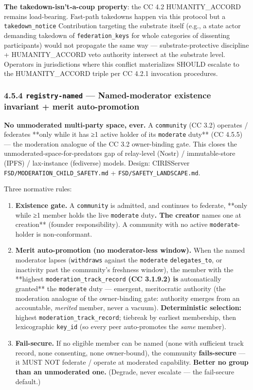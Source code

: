 \documentclass[11pt]{article}
\begin{document}
\textbf{The takedown-isn't-a-coup property}: the CC 4.2 HUMANITY\_ACCORD remains load-bearing. Fast-path takedowns happen via this protocol but a \texttt{takedown\_notice} Contribution targeting the substrate itself (e.g., a state actor demanding takedown of \texttt{federation\_keys} for whole categories of dissenting participants) would not propagate the same way — substrate-protective discipline + HUMANITY\_ACCORD veto authority intersect at the substrate level. Operators in jurisdictions where this conflict materializes SHOULD escalate to the HUMANITY\_ACCORD triple per CC 4.2.1 invocation procedures.


\subsubsection*{4.5.4 \texttt{registry-named} — Named-moderator existence invariant + merit auto-promotion}


\textbf{No unmoderated multi-party space, ever.} A \texttt{community} (CC 3.2) operates / federates **only while it has ≥1 active holder of its \texttt{moderate} duty** (CC 4.5.5) — the moderation analogue of the CC 3.2 owner-binding gate. This closes the unmoderated-space-for-predators gap of relay-level (Nostr) / immutable-store (IPFS) / lax-instance (fediverse) models. Design: CIRISServer \texttt{FSD/MODERATION\_CHILD\_SAFETY.md} + \texttt{FSD/SAFETY\_LANDSCAPE.md}.


Three normative rules:


\begin{enumerate}\setlength\itemsep{0pt}
\item \textbf{Existence gate.} A \texttt{community} is admitted, and continues to federate, **only while ≥1 member holds the live \texttt{moderate} duty\textbf{. The creator }names one at creation** (founder responsibility). A community with no active \texttt{moderate}-holder is non-conformant.
\item \textbf{Merit auto-promotion (no moderator-less window).} When the named moderator lapses (\texttt{withdraws} against the \texttt{moderate} \texttt{delegates\_to}, or inactivity past the community's freshness window), the member with the **highest \texttt{moderation\_track\_record}\textbf{ (CC 3.1.9.2) is }automatically granted** the \texttt{moderate} duty — emergent, meritocratic authority (the moderation analogue of the owner-binding gate: authority emerges from an accountable, \textit{merited} member, never a vacuum). \textbf{Deterministic selection:} highest \texttt{moderation\_track\_record}; tiebreak by earliest membership, then lexicographic \texttt{key\_id} (so every peer auto-promotes the \textit{same} member).
\item \textbf{Fail-secure.} If no eligible member can be named (none with sufficient track record, none consenting, none owner-bound), the community \textbf{fails-secure} — it MUST NOT federate / operate at moderated capability. \textbf{Better no group than an unmoderated one.} (Degrade, never escalate — the fail-secure default.)
\end{enumerate}
\end{document}
